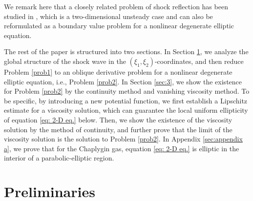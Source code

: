 \documentclass[reqno,12pt]{amsart}
\numberwithin{equation}{section}
\begin{document}
We remark here that a closely related problem of shock reflection has been studied in \cite{CFe10,CFe18}, which is a two-dimensional unsteady case and can also be reformulated as a boundary value problem for a nonlinear degenerate elliptic equation.

The rest of the paper is structured into two sections. In Section \ref{sec:2}, we analyze the global structure of the shock wave in the $(\xi_1,\xi_2)$-coordinates, and then reduce Problem \ref{prob1} to an oblique derivative problem for a nonlinear degenerate elliptic equation, i.e., Problem \ref{prob2}. In Section \ref{sec:3}, we show the existence for Problem \ref{prob2} by the continuity method and vanishing viscosity method. To be specific, by introducing a new potential function, we first establish a Lipschitz estimate for a viscosity solution, which can guarantee the local uniform ellipticity of equation \eqref{eq: 2-D eq.} below. Then, we show the existence of the viscosity solution by the method of continuity, and further prove that the limit of the viscosity solution is the solution to Problem \ref{prob2}. In Appendix \ref{sec:appendix a}, we prove that for the Chaplygin gas, equation \eqref{eq: 2-D eq.} is elliptic in the interior of a parabolic-elliptic region.	

    \section{Preliminaries}\label{sec:2}
\end{document}
